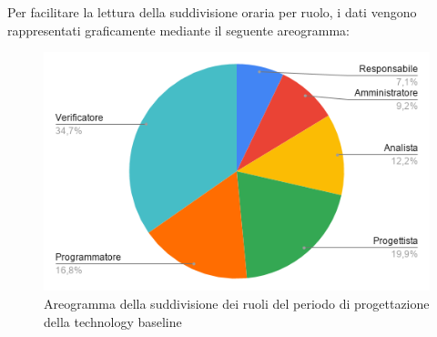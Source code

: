 \documentclass[../piano-di-progetto.tex]{subfiles}
\begin{document}
  Per facilitare la lettura della suddivisione oraria per ruolo, i dati vengono rappresentati graficamente mediante il seguente areogramma:
  \begin{figure}[H]
    \centering
    \includegraphics[width=12cm]{img/ruoli-progettazione.png}
    \caption{Areogramma della suddivisione dei ruoli del periodo di progettazione della technology baseline}
    \label{fig:ore-ruolo-progettazione}
  \end{figure}
\end{document}
